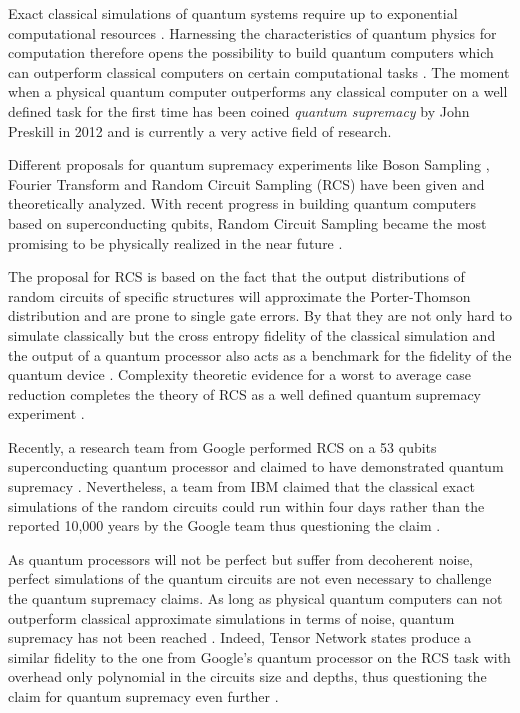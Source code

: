 Exact classical simulations of quantum systems require up to exponential computational resources \cite{feynman1999simulating}.
Harnessing the characteristics of quantum physics for computation therefore opens the possibility to build quantum computers which can outperform classical computers on 
certain computational tasks \cite{shor1999polynomial}. The moment when a physical quantum computer outperforms any classical computer on a well defined task
for the first time has been coined \textit{quantum supremacy} by John
Preskill in 2012 and is currently a very active field of research.

Different proposals for quantum supremacy experiments like Boson Sampling \cite{aaronson2010computational}, Fourier Transform \cite{fefferman2015power} and Random Circuit Sampling (RCS) \cite{boixo2018characterizing} have
been given and theoretically analyzed. With recent progress in building quantum computers based on 
superconducting qubits, Random Circuit Sampling became the most promising to be physically realized in the near future \cite{boul2018quantum}.

The proposal for RCS is based on the fact that the output distributions of random circuits of specific structures will 
approximate the Porter-Thomson distribution and are prone to single gate errors. By that they are not only hard 
to simulate classically but the cross entropy fidelity of the classical simulation and the output of a 
quantum processor also acts as a benchmark for the fidelity of the quantum device \cite{boixo2018characterizing}. Complexity theoretic 
evidence for a worst to average case reduction completes the theory of 
RCS as a well defined quantum supremacy experiment \cite{boul2018quantum}.

Recently, a research team from Google performed RCS on a 53 qubits superconducting 
quantum processor and claimed to have demonstrated quantum supremacy \cite{google2019supremacy}. Nevertheless, a team from IBM 
claimed that the classical exact simulations of the random circuits could run within four days
rather than the reported 10,000 years by the Google team thus questioning the claim \cite{pednault2019leveraging}.

As quantum processors will not be perfect but suffer from decoherent noise, perfect simulations 
of the quantum circuits are not even necessary to challenge the quantum supremacy claims. 
As long as physical quantum computers can not outperform classical approximate simulations in 
terms of noise, quantum supremacy has not been reached \cite{boixo2018characterizing}.
Indeed, Tensor Network states produce a similar fidelity to the one from Google's quantum processor on the RCS task 
with overhead only polynomial in the circuits size and depths, thus questioning the claim for quantum supremacy even further \cite{fefferman2015power}.

